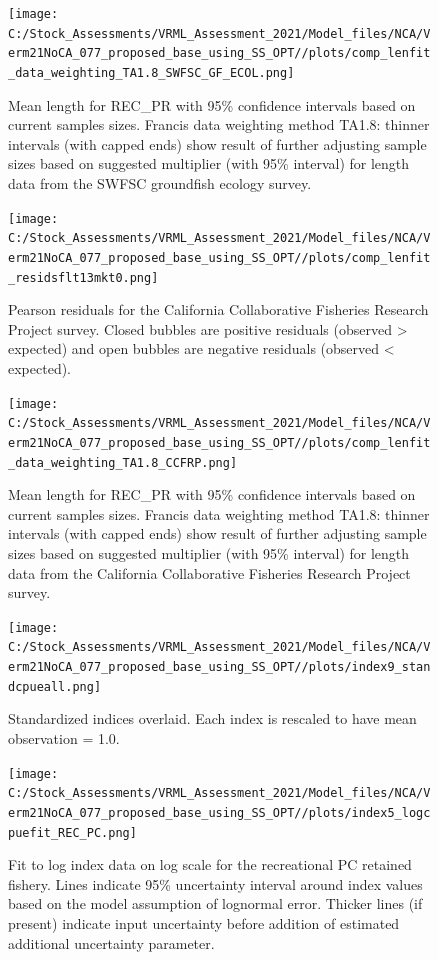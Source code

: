 \documentclass[
  english,
  a4paper,
]{article}
\begin{document}
\begin{figure}
\centering
\texttt{[image: C:/Stock\_Assessments/VRML\_Assessment\_2021/Model\_files/NCA/Verm21NoCA\_077\_proposed\_base\_using\_SS\_OPT//plots/comp\_lenfit\_data\_weighting\_TA1.8\_SWFSC\_GF\_ECOL.png]}
\caption{Mean length for REC\_PR with 95\% confidence intervals based on current samples sizes. Francis data weighting method TA1.8: thinner intervals (with capped ends) show result of further adjusting sample sizes based on suggested multiplier (with 95\% interval) for length data from the SWFSC groundfish ecology survey.\label{fig:mean-len-fit-SWFSC-GF-ECOL}}
\end{figure}

\begin{figure}
\centering
\texttt{[image: C:/Stock\_Assessments/VRML\_Assessment\_2021/Model\_files/NCA/Verm21NoCA\_077\_proposed\_base\_using\_SS\_OPT//plots/comp\_lenfit\_residsflt13mkt0.png]}
\caption{Pearson residuals for the California Collaborative Fisheries Research Project survey. Closed bubbles are positive residuals (observed \textgreater{} expected) and open bubbles are negative residuals (observed \textless{} expected).\label{fig:len-pearson-CCFRP}}
\end{figure}

\begin{figure}
\centering
\texttt{[image: C:/Stock\_Assessments/VRML\_Assessment\_2021/Model\_files/NCA/Verm21NoCA\_077\_proposed\_base\_using\_SS\_OPT//plots/comp\_lenfit\_data\_weighting\_TA1.8\_CCFRP.png]}
\caption{Mean length for REC\_PR with 95\% confidence intervals based on current samples sizes. Francis data weighting method TA1.8: thinner intervals (with capped ends) show result of further adjusting sample sizes based on suggested multiplier (with 95\% interval) for length data from the California Collaborative Fisheries Research Project survey.\label{fig:mean-len-fit-CCFRP}}
\end{figure}

\FloatBarrier

\FloatBarrier

\begin{figure}
\centering
\texttt{[image: C:/Stock\_Assessments/VRML\_Assessment\_2021/Model\_files/NCA/Verm21NoCA\_077\_proposed\_base\_using\_SS\_OPT//plots/index9\_standcpueall.png]}
\caption{Standardized indices overlaid. Each index is rescaled to have mean observation = 1.0.\label{fig:cpueall}}
\end{figure}

\begin{figure}
\centering
\texttt{[image: C:/Stock\_Assessments/VRML\_Assessment\_2021/Model\_files/NCA/Verm21NoCA\_077\_proposed\_base\_using\_SS\_OPT//plots/index5\_logcpuefit\_REC\_PC.png]}
\caption{Fit to log index data on log scale for the recreational PC retained fishery. Lines indicate 95\% uncertainty interval around index values based on the model assumption of lognormal error. Thicker lines (if present) indicate input uncertainty before addition of estimated additional uncertainty parameter.\label{fig:log-cpue-REC-PC}}
\end{figure}
\end{document}
